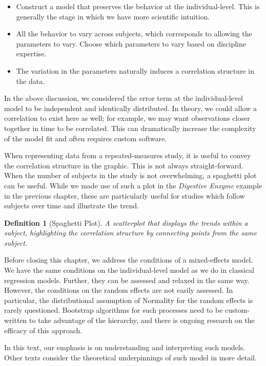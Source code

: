 \documentclass[
]{book}
\providecommand{\tightlist}{%
  \setlength{\itemsep}{0pt}\setlength{\parskip}{0pt}}
\theoremstyle{plain}
\theoremstyle{mydefn}
\newtheorem{definition}{Definition}[chapter]
\theoremstyle{myexmpl}
\theoremstyle{remark}
\begin{document}
\begin{itemize}
\tightlist
\item
  Construct a model that preserves the behavior at the individual-level. This is generally the stage in which we have more scientific intuition.
\item
  All the behavior to vary across subjects, which corresponds to allowing the parameters to vary. Choose which parameters to vary based on discipline expertise.
\item
  The variation in the parameters naturally induces a correlation structure in the data.
\end{itemize}

In the above discussion, we considered the error term at the individual-level model to be independent and identically distributed. In theory, we could allow a correlation to exist here as well; for example, we may want observations closer together in time to be correlated. This can dramatically increase the complexity of the model fit and often requires custom software.

When representing data from a repeated-measures study, it is useful to convey the correlation structure in the graphic. This is not always straight-forward. When the number of subjects in the study is not overwhelming, a spaghetti plot can be useful. While we made use of such a plot in the \emph{Digestive Enzyme} example in the previous chapter, these are particularly useful for studies which follow subjects over time and illustrate the trend.

\begin{definition}[Spaghetti Plot]
A scatterplot that displays the trends within a subject, highlighting the correlation structure by connecting points from the same subject.
\end{definition}

Before closing this chapter, we address the conditions of a mixed-effects model. We have the same conditions on the individual-level model as we do in classical regression models. Further, they can be assessed and relaxed in the same way. However, the conditions on the random effects are not easily assessed. In particular, the distributional assumption of Normality for the random effects is rarely questioned. Bootstrap algorithms for such processes need to be custom-written to take advantage of the hierarchy, and there is ongoing research on the efficacy of this approach.

In this text, our emphasis is on understanding and interpreting such models. Other texts consider the theoretical underpinnings of such model in more detail.
\end{document}
